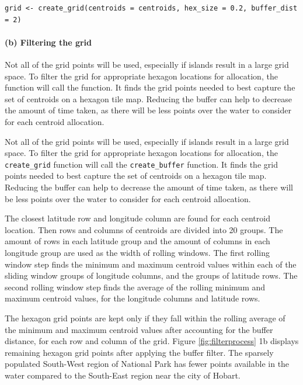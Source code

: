\begin{verbatim}
grid <- create_grid(centroids = centroids, hex_size = 0.2, buffer_dist = 2)
\end{verbatim}

\hypertarget{b-filtering-the-grid}{%
\paragraph{(b) Filtering the grid}\label{b-filtering-the-grid}}

Not all of the grid points will be used, especially if islands result in
a large grid space. To filter the grid for appropriate hexagon locations
for allocation, the  function will call the
 function. It finds the grid points needed to best
capture the set of centroids on a hexagon tile map. Reducing the buffer
can help to decrease the amount of time taken, as there will be less
points over the water to consider for each centroid allocation.

Not all of the grid points will be used, especially if islands result in
a large grid space. To filter the grid for appropriate hexagon locations
for allocation, the \texttt{create\_grid} function will call the
\texttt{create\_buffer} function. It finds the grid points needed to
best capture the set of centroids on a hexagon tile map. Reducing the
buffer can help to decrease the amount of time taken, as there will be
less points over the water to consider for each centroid allocation.

The closest latitude row and longitude column are found for each
centroid location. Then rows and columns of centroids are divided into
20 groups. The amount of rows in each latitude group and the amount of
columns in each longitude group are used as the width of rolling
windows. The first rolling window step finds the minimum and maximum
centroid values within each of the sliding window groups of longitude
columns, and the groups of latitude rows. The second rolling window step
finds the average of the rolling minimum and maximum centroid values,
for the longitude columns and latitude rows.

The hexagon grid points are kept only if they fall within the rolling
average of the minimum and maximum centroid values after accounting for
the buffer distance, for each row and column of the grid. Figure
\ref{fig:filterprocess} 1b displays remaining hexagon grid points after
applying the buffer filter. The sparsely populated South-West region of
National Park has fewer points available in the water compared to the
South-East region near the city of Hobart.


